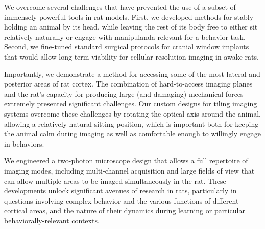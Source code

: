 We overcome several challenges that have prevented the use of a subset of immensely powerful tools in rat models. First, we developed methods for stably holding an animal by its head, while leaving the rest of its body free to either sit relatively naturally or engage with manipulanda relevant for a behavior task. Second, we fine-tuned standard surgical protocols for cranial window implants that would allow long-term viability for cellular resolution imaging in awake rats. 

Importantly, we demonstrate a method for accessing some of the most lateral and posterior areas of rat cortex. The combination of hard-to-access imaging planes and the rat's capacity for producing large (and damaging) mechanical forces extremely presented significant challenges. Our custom designs for tiling imaging systems overcome these challenges by rotating the optical axis around the animal, allowing a relatively natural sitting position, which is important both for keeping the animal calm during imaging as well as comfortable enough to willingly engage in behaviors. 

We engineered a two-photon microscope design that allows a full repertoire of imaging modes, including multi-channel acquisition and large fields of view that can allow multiple areas to be imaged simultaneously in the rat. These developments unlock significant avenues of research in rats, particularly in questions involving complex behavior and the various functions of different cortical areas, and the nature of their dynamics during learning or particular behaviorally-relevant contexts. 





